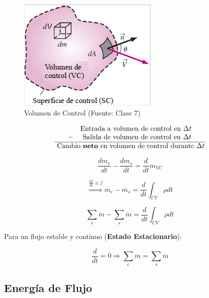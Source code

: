     \begin{multicols}{2}
    \begin{figure}[H]
        \centering
        \label{fig:control_vol}
        \caption{Volumen de Control (Fuente: Clase 7)}
        \includegraphics[width=.85\textwidth]{img/clases/volumen_control.png}
    \end{figure}

    \[\begin{matrix}
        \begin{matrix}
            & \text{Entrada a volumen de control en }\Delta t \\
            - & \text{ Salida de volumen de control en }\Delta t
        \end{matrix} \\
        \overline{\text{ Cambio \textbf{neto} en volumen de control durante }\Delta t}
    \end{matrix}\]
    
    \[\frac{dm_{e}}{dt} - \frac{dm_{s}}{dt} = \frac{d}{dt}m_{VC}\]
    
    \[\overset{\frac{df}{dt}\equiv \dot{f}}{\Rightarrow} \dot{m_{e}} - \dot{m_{s}} = \frac{d}{dt} \int_{CV} \rho dt\]
    
    \[\sum_{e} \dot{m} - \sum_{s} \dot{m} = \frac{d}{dt} \int_{CV} \rho dt\]
    \end{multicols}
    
    Para un flujo estable y continuo (\textbf{Estado Estacionario}):
    
    \[\frac{d}{dt}=0 \Rightarrow \sum_{e} \dot{m} = \sum_{s} \dot{m}\]

    \subsection{Energía de Flujo}
    
